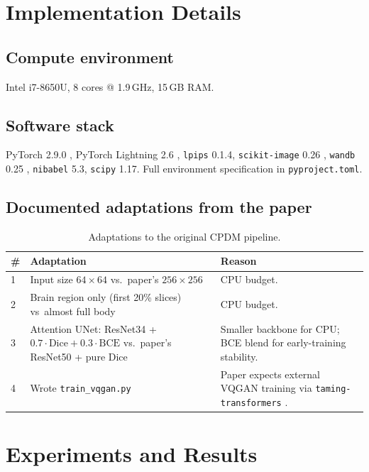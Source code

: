 \documentclass[11pt,a4paper]{article}
\begin{document}
\section{Implementation Details}

\subsection{Compute environment}

Intel i7-8650U, 8 cores @ 1.9\,GHz, 15\,GB RAM. 

\subsection{Software stack}

PyTorch 2.9.0 \parencite{paszke2019pytorch}, PyTorch Lightning 2.6 \parencite{falcon2019lightning}, \texttt{lpips} 0.1.4, \texttt{scikit-image} 0.26 \parencite{walt2014scikitimage}, \texttt{wandb} 0.25 \parencite{biewald2020wandb}, \texttt{nibabel} 5.3, \texttt{scipy} 1.17. Full environment specification in \texttt{pyproject.toml}.

\subsection{Documented adaptations from the paper}

\begin{table}[h]
\centering
\small
\begin{tabular}{p{0.5cm}p{6.2cm}p{6.5cm}}
\toprule
\# & Adaptation & Reason \\
\midrule
1 & Input size $64 \times 64$ vs.\ paper's $256 \times 256$ & CPU budget. \\
2 & Brain region only (first 20\% slices) vs\ almost full body & CPU budget. \\
3 & Attention UNet: ResNet34 + $0.7\cdot\text{Dice} + 0.3\cdot\text{BCE}$ vs.\ paper's ResNet50 + pure Dice & Smaller backbone for CPU; BCE blend for early-training stability. \\
4 & Wrote \texttt{train\_vqgan.py} & Paper expects external VQGAN training via \texttt{taming-transformers} \parencite{esser2021vqgan}. \\
\bottomrule
\end{tabular}
\caption{Adaptations to the original CPDM pipeline.}
\label{tab:adaptations}
\end{table}

\section{Experiments and Results}
\end{document}
